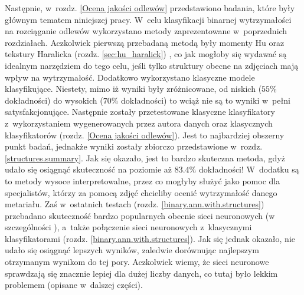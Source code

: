 Następnie, w~rozdz. \ref{Ocena jakości odlewów} przedstawiono badania, które były głównym tematem niniejszej pracy. W~celu klasyfikacji binarnej wytrzymałości na rozciąganie odlewów wykorzystano metody zaprezentowane w~poprzednich rozdziałach. Aczkolwiek pierwszą przebadaną metodą były momenty Hu oraz tekstury Haralicka (rozdz. \ref{sec:hu_haralick}) , co jak mogłoby się wydawać są idealnym narzędziem do tego celu, jeśli tylko struktury obecne na zdjęciach mają wpływ na wytrzymałość. Dodatkowo wykorzystano klasyczne modele klasyfikujące. Niestety, mimo iż wyniki były zróżnicowane, od niskich ($55\%$ dokładności) do wysokich ($70\%$ dokładności) to wciąż nie są to wyniki w~pełni satysfakcjonujące. Następnie zostały przetestowane klasyczne klasyfikatory z~wykorzystaniem wygenerowanych przez autora danych oraz klasycznych klasyfikatorów (rozdz. \ref{Ocena jakości odlewów}). Jest to najbardziej obszerny punkt badań, jednakże wyniki zostały zbiorczo przedstawione w~rozdz. \ref{structures.summary}. Jak się okazało, jest to bardzo skuteczna metoda, gdyż udało się osiągnąć skuteczność na poziomie aż $83.4\%$ dokładności! W~dodatku są to metody wysoce interpretowalne, przez co mogłyby służyć jako pomoc dla specjalistów, którzy za pomocą zdjęć chcieliby ocenić wytrzymałość danego metariału. Zaś w~ostatnich testach (rozdz. \ref{binary.ann.with.structures}) przebadano skuteczność bardzo popularnych obecnie sieci neuronowych (w szczególności ), a~także połączenie sieci neuronowych z~klasycznymi klasyfikatorami (rozdz. \ref{binary.ann.with.structures}). Jak się jednak okazało, nie udało się osiągnąć lepszych wyników, zaledwie dorównując najlepszym otrzymanym wynikom do tej pory. Aczkolwiek wiemy, że sieci neuronowe sprawdzają się znacznie lepiej dla dużej liczby danych, co tutaj było lekkim problemem (opisane w~dalszej części).

